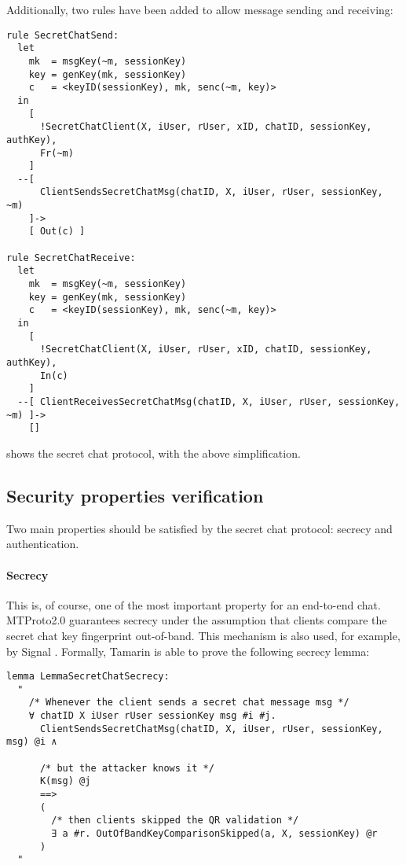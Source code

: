 Additionally, two rules have been added to allow message sending and receiving:

\begin{lstlisting}
rule SecretChatSend:
  let
    mk  = msgKey(~m, sessionKey)
    key = genKey(mk, sessionKey)
    c   = <keyID(sessionKey), mk, senc(~m, key)>
  in
    [ 
      !SecretChatClient(X, iUser, rUser, xID, chatID, sessionKey, authKey),
      Fr(~m)
    ]
  --[
      ClientSendsSecretChatMsg(chatID, X, iUser, rUser, sessionKey, ~m)
    ]->
    [ Out(c) ]

rule SecretChatReceive:
  let
    mk  = msgKey(~m, sessionKey)
    key = genKey(mk, sessionKey)
    c   = <keyID(sessionKey), mk, senc(~m, key)>
  in
    [
      !SecretChatClient(X, iUser, rUser, xID, chatID, sessionKey, authKey),
      In(c)
    ]
  --[ ClientReceivesSecretChatMsg(chatID, X, iUser, rUser, sessionKey, ~m) ]->
    []
\end{lstlisting}

 shows the secret chat protocol, with the above simplification.

\subsection{Security properties verification}

Two main properties should be satisfied by the secret chat protocol: secrecy and authentication.


\paragraph{Secrecy} This is, of course, one of the most important property for an end-to-end chat. MTProto2.0 guarantees secrecy under the assumption that clients compare the secret chat key fingerprint out-of-band. This mechanism is also used, for example, by Signal \cite{SignalProtocol}. Formally, Tamarin is able to prove the following secrecy lemma:

\begin{lstlisting}
lemma LemmaSecretChatSecrecy:
  "
    /* Whenever the client sends a secret chat message msg */
    ∀ chatID X iUser rUser sessionKey msg #i #j.
      ClientSendsSecretChatMsg(chatID, X, iUser, rUser, sessionKey, msg) @i ∧
      
      /* but the attacker knows it */
      K(msg) @j
      ==>
      (
        /* then clients skipped the QR validation */
        ∃ a #r. OutOfBandKeyComparisonSkipped(a, X, sessionKey) @r
      )
  "
\end{lstlisting}

